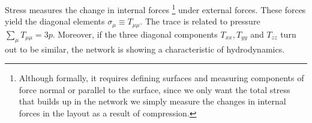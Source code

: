 \documentclass[nofootinbib,preprint,floatfix,endfloats]{revtex4} %
\begin{document}
Stress measures the change in internal forces
\footnote{Although formally, it requires defining surfaces and measuring components of force normal or parallel to the surface, since we only want the total stress that builds up in the network we simply measure the changes in internal forces in the layout as a result of compression.} under external forces.
These forces yield 
the  diagonal elements $ \sigma_\mu \equiv T_{\mu\mu}$. 
The trace  is related to pressure $\sum_\mu T_{\mu\mu} = 3p$. 
Moreover, if the three diagonal  components $T_{xx}, T_{yy}$ and $T_{zz}$ turn out to be similar, the network is showing a characteristic of hydrodynamics. 
\end{document}
